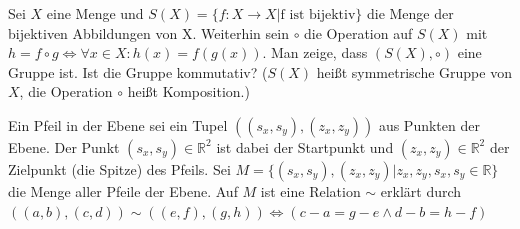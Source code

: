 \documentclass[10pt, a4paper]{exam}
\begin{document}
\begin{questions}

    \question Sei $X$ eine Menge und $S(X)=\{f: X\rightarrow X | \text{f ist bijektiv}\}$ die Menge der bijektiven Abbildungen von X. Weiterhin sein $\circ$ die Operation auf $S(X)$ mit $h=f\circ g \Leftrightarrow\forall x\in X: h(x) = f(g(x))$.
    Man zeige, dass $(S(X),\circ)$ eine Gruppe ist. Ist die Gruppe kommutativ? ($S(X)$ heißt
    symmetrische Gruppe von $X$, die Operation $\circ$ heißt Komposition.)
    \begin{solution}
    \end{solution}

    \question Ein Pfeil in der Ebene sei ein Tupel $((s_x,s_y),(z_x,z_y))$ aus Punkten der Ebene. Der Punkt $(s_x,s_y)\in\mathbb{R}^2$ ist dabei der Startpunkt und $(z_x,z_y)\in\mathbb{R}^2$  der Zielpunkt (die Spitze) des Pfeils. Sei $M=\{(s_x,s_y),(z_x,z_y)|z_x,z_y,s_x,s_y\in\mathbb{R}\}$ die Menge aller Pfeile der Ebene. Auf $M$ ist eine Relation $\sim$ erklärt durch $((a, b), (c, d)) \sim ((e, f ), (g, h))\Leftrightarrow (c - a = g - e \wedge d - b = h - f )$


\end{questions}
\end{document}
